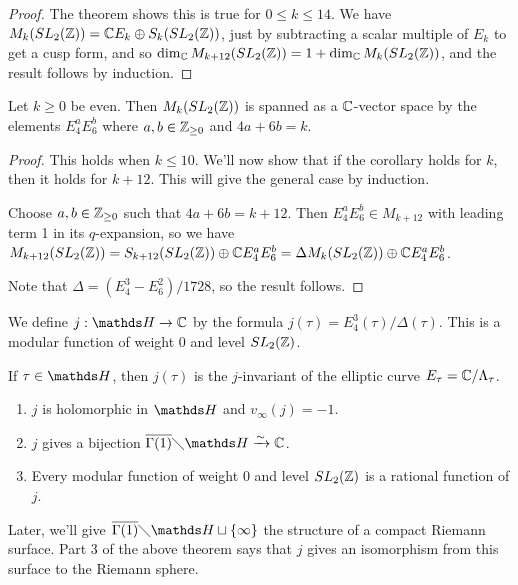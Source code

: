 \documentclass[10pt,a4paper]{article}
\begin{document}
\begin{proof}
  The theorem shows this is true for $0 \leq k \leq 14$. We have $M_k(SL_2(\mathbb{Z})) = \mathbb{C} E_k \oplus S_k(SL_2(\mathbb{Z}))$, just by subtracting a scalar multiple of $E_k$ to get a cusp form, and so $\dim_{\mathbb{C}} M_{k+12}(SL_2(\mathbb{Z})) = 1+\dim_{\mathbb{C}} M_k(SL_2(\mathbb{Z}))$, and the result follows by induction.
\end{proof}
\begin{corollary}
  Let $k \geq 0$ be even. Then $M_k(SL_2(\mathbb{Z}))$ is spanned as a $\mathbb{C}$-vector space by the elements $E_4^a E_6^b$ where $a, b \in \mathbb{Z}_{\geq 0}$ and $4a+6b = k$.
\end{corollary}
\begin{proof}
  This holds when $k \leq 10$. We'll now show that if the corollary holds for $k$, then it holds for $k+12$. This will give the general case by induction.

  Choose $a, b \in \mathbb{Z}_{\geq 0}$ such that $4a+6b = k +12$. Then $E_4^a E_6^b \in M_{k+12}$ with leading term 1 in its $q$-expansion, so we have $M_{k+12}(SL_2(\mathbb{Z})) = S_{k+12}(SL_2(\mathbb{Z})) \oplus \mathbb{C} E_4^a E_6^b = \Delta M_{k}(SL_2(\mathbb{Z})) \oplus \mathbb{C} E_4^aE_6^b$.

  Note that $\Delta = (E_4^3-E_6^2)/1728$, so the result follows.
\end{proof}
\begin{definition}
  We define $j:\H \to \C$ by the formula $j(\tau) = E_4^3(\tau)/\Delta(\tau)$. This is a modular function of weight 0 and level $SL_2(\mathbb{Z})$.
\end{definition}
If $\tau \in \H$, then $j(\tau)$ is the $j$-invariant of the elliptic curve $E_\tau = \mathbb{C}/\Lambda_\tau$.
\begin{theorem}\hspace*{0cm}
  \begin{enumerate}
    \item $j$ is holomorphic in $\H$ and $v_\infty(j) = -1$.
    \item $j$ gives a bijection $\overline{\Gamma(1)}\diagdown \H \xrightarrow{\sim} \C$.
    \item Every modular function of weight $0$ and level $SL_2(\mathbb{Z})$ is a rational function of $j$.
  \end{enumerate}
\end{theorem}
Later, we'll give $\overline{\Gamma(1)}\diagdown \H \sqcup \{\infty\}$ the structure of a compact Riemann surface. Part 3 of the above theorem says that $j$ gives an isomorphism from this surface to the Riemann sphere.
\end{document}
